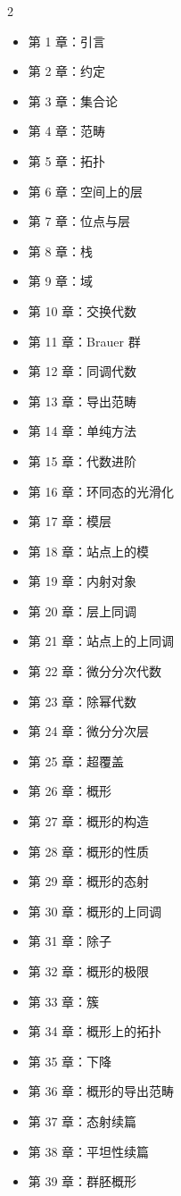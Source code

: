 \begin{multicols}{2}
\begin{itemize}
\item 第 1 章：引言
\item 第 2 章：约定
\item 第 3 章：集合论
\item 第 4 章：范畴
\item 第 5 章：拓扑
\item 第 6 章：空间上的层
\item 第 7 章：位点与层
\item 第 8 章：栈
\item 第 9 章：域
\item 第 10 章：交换代数
\item 第 11 章：Brauer 群
\item 第 12 章：同调代数
\item 第 13 章：导出范畴
\item 第 14 章：单纯方法
\item 第 15 章：代数进阶
\item 第 16 章：环同态的光滑化
\item 第 17 章：模层
\item 第 18 章：站点上的模
\item 第 19 章：内射对象
\item 第 20 章：层上同调
\item 第 21 章：站点上的上同调
\item 第 22 章：微分分次代数
\item 第 23 章：除幂代数
\item 第 24 章：微分分次层
\item 第 25 章：超覆盖
\item 第 26 章：概形
\item 第 27 章：概形的构造
\item 第 28 章：概形的性质
\item 第 29 章：概形的态射
\item 第 30 章：概形的上同调
\item 第 31 章：除子
\item 第 32 章：概形的极限
\item 第 33 章：簇
\item 第 34 章：概形上的拓扑
\item 第 35 章：下降
\item 第 36 章：概形的导出范畴
\item 第 37 章：态射续篇
\item 第 38 章：平坦性续篇
\item 第 39 章：群胚概形

\end{itemize}
\end{multicols}
